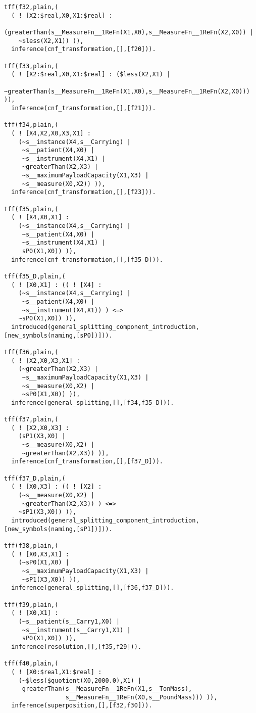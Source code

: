 \documentclass{article}
\begin{document}
\begin{verbatim}
tff(f32,plain,(
  ( ! [X2:$real,X0,X1:$real] : 
    (greaterThan(s__MeasureFn__1ReFn(X1,X0),s__MeasureFn__1ReFn(X2,X0)) | 
    ~$less(X2,X1)) )),
  inference(cnf_transformation,[],[f20])).

tff(f33,plain,(
  ( ! [X2:$real,X0,X1:$real] : ($less(X2,X1) | 
    ~greaterThan(s__MeasureFn__1ReFn(X1,X0),s__MeasureFn__1ReFn(X2,X0))) )),
  inference(cnf_transformation,[],[f21])).

tff(f34,plain,(
  ( ! [X4,X2,X0,X3,X1] : 
    (~s__instance(X4,s__Carrying) | 
     ~s__patient(X4,X0) | 
     ~s__instrument(X4,X1) | 
     ~greaterThan(X2,X3) | 
     ~s__maximumPayloadCapacity(X1,X3) | 
     ~s__measure(X0,X2)) )),
  inference(cnf_transformation,[],[f23])).

tff(f35,plain,(
  ( ! [X4,X0,X1] : 
    (~s__instance(X4,s__Carrying) | 
     ~s__patient(X4,X0) |
     ~s__instrument(X4,X1) | 
     sP0(X1,X0)) )),
  inference(cnf_transformation,[],[f35_D])).

tff(f35_D,plain,(
  ( ! [X0,X1] : (( ! [X4] : 
    (~s__instance(X4,s__Carrying) | 
     ~s__patient(X4,X0) | 
     ~s__instrument(X4,X1)) ) <=> 
    ~sP0(X1,X0)) )),
  introduced(general_splitting_component_introduction,[new_symbols(naming,[sP0])])).

tff(f36,plain,(
  ( ! [X2,X0,X3,X1] : 
    (~greaterThan(X2,X3) | 
     ~s__maximumPayloadCapacity(X1,X3) | 
     ~s__measure(X0,X2) | 
     ~sP0(X1,X0)) )),
  inference(general_splitting,[],[f34,f35_D])).

tff(f37,plain,(
  ( ! [X2,X0,X3] : 
    (sP1(X3,X0) | 
     ~s__measure(X0,X2) | 
     ~greaterThan(X2,X3)) )),
  inference(cnf_transformation,[],[f37_D])).

tff(f37_D,plain,(
  ( ! [X0,X3] : (( ! [X2] : 
    (~s__measure(X0,X2) | 
     ~greaterThan(X2,X3)) ) <=> 
    ~sP1(X3,X0)) )),
  introduced(general_splitting_component_introduction,[new_symbols(naming,[sP1])])).

tff(f38,plain,(
  ( ! [X0,X3,X1] : 
    (~sP0(X1,X0) | 
     ~s__maximumPayloadCapacity(X1,X3) | 
     ~sP1(X3,X0)) )),
  inference(general_splitting,[],[f36,f37_D])).

tff(f39,plain,(
  ( ! [X0,X1] : 
    (~s__patient(s__Carry1,X0) | 
     ~s__instrument(s__Carry1,X1) | 
     sP0(X1,X0)) )),
  inference(resolution,[],[f35,f29])).

tff(f40,plain,(
  ( ! [X0:$real,X1:$real] : 
    (~$less($quotient(X0,2000.0),X1) |   
     greaterThan(s__MeasureFn__1ReFn(X1,s__TonMass),
                 s__MeasureFn__1ReFn(X0,s__PoundMass))) )),
  inference(superposition,[],[f32,f30])).


\end{verbatim}
\end{document}
